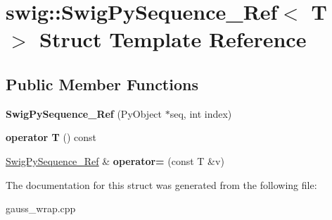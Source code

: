 \hypertarget{structswig_1_1_swig_py_sequence___ref}{\section{swig\-:\-:Swig\-Py\-Sequence\-\_\-\-Ref$<$ T $>$ Struct Template Reference}
\label{structswig_1_1_swig_py_sequence___ref}
}
\subsection*{Public Member Functions}
\begin{DoxyCompactItemize}
\item 
\hypertarget{structswig_1_1_swig_py_sequence___ref_a37931833739c148cd4feebe0643d5f2a}{{\bfseries Swig\-Py\-Sequence\-\_\-\-Ref} (Py\-Object $\ast$seq, int index)}\label{structswig_1_1_swig_py_sequence___ref_a37931833739c148cd4feebe0643d5f2a}

\item 
\hypertarget{structswig_1_1_swig_py_sequence___ref_aa35a6fb678b087e5b7c680a74ec31c6f}{{\bfseries operator T} () const }\label{structswig_1_1_swig_py_sequence___ref_aa35a6fb678b087e5b7c680a74ec31c6f}

\item 
\hypertarget{structswig_1_1_swig_py_sequence___ref_a71732475dadcaebf7e61bd5377199ee2}{\hyperlink{structswig_1_1_swig_py_sequence___ref}{Swig\-Py\-Sequence\-\_\-\-Ref} \& {\bfseries operator=} (const T \&v)}\label{structswig_1_1_swig_py_sequence___ref_a71732475dadcaebf7e61bd5377199ee2}

\end{DoxyCompactItemize}


The documentation for this struct was generated from the following file\-:\begin{DoxyCompactItemize}
\item 
gauss\-\_\-wrap.\-cpp\end{DoxyCompactItemize}
